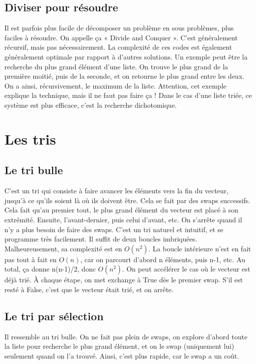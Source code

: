 \documentclass[10pt]{article}
\begin{document}
\subsection{Diviser pour résoudre}
Il est parfois plus facile de décomposer un problème en sous problèmes, plus faciles à résoudre. On appelle ça « Divide and Conquer ». C'est généralement récursif, mais pas nécessairement. La complexité de ces codes est également généralement optimale par rapport à d'autres solutions.  
\newline \newline 
Un exemple peut être la recherche du plus grand élément d'une liste. On trouve le plus grand de la première moitié, puis de la seconde, et on retourne le plus grand entre les deux. On a ainsi, récursivement, le maximum de la liste. Attention, cet exemple explique la technique, mais il ne faut pas faire ça !  
\newline \newline 
Dans le cas d'une liste triée, ce système est plus efficace, c'est la recherche dichotomique. 
\newpage
\section{Les tris}
\subsection{Le tri bulle}
C'est un tri qui consiste à faire avancer les éléments vers la fin du vecteur, jusqu'à ce qu'ils soient là où ils doivent être. Cela se fait par des swaps successifs. Cela fait qu'au premier tout, le plus grand élément du vecteur est placé à son extrémité. Ensuite, l'avant-dernier, puis celui d'avant, etc. On s'arrête quand il n'y a plus besoin de faire des swaps. 
\newline \newline 
C'est un tri naturel et intuitif, et se programme très facilement. Il suffit de deux boucles imbriquées. Malheureusement, sa complexité est en $O(n^2)$. La boucle intérieure n'est en fait pas tout à fait en $O(n)$, car on parcourt d'abord n éléments, puis n-1, etc. Au total, ça donne n(n-1)/2, donc $O(n^2)$. 
\newline \newline 
On peut accélérer le cas où le vecteur est déjà trié. À chaque étape, on met exchange à True dès le premier swap. S'il est resté à False, c'est que le vecteur était trié, et on arrête.
\subsection{Le tri par sélection}
Il ressemble au tri bulle. On ne fait pas plein de swaps, on explore d'abord toute la liste pour recherche le plus grand élément, et on le swap (uniquement lui) seulement quand on l'a trouvé. Ainsi, c'est plus rapide, car le swap a un coût.
\end{document}
